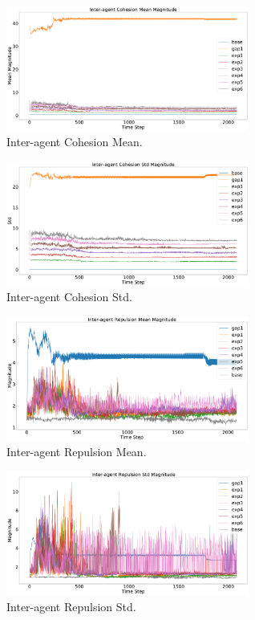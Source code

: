 \documentclass[12pt,a4paper]{IEEEtran}
\begin{document}
\begin{figure}[H]
	\begin{center}
		\includegraphics[width=8cm]{figures/InteragentCohesionMean}
	\end{center}
	\caption{Inter-agent Cohesion Mean. \label{fig:interagentCohesionMean}}
\end{figure}

\begin{figure}[H]
	\begin{center}
		\includegraphics[width=8cm]{figures/InteragentCohesionStd}
	\end{center}
	\caption{Inter-agent Cohesion Std. \label{fig:interagentCohesionStd}}
\end{figure}

\begin{figure}[H]
	\begin{center}
		\includegraphics[width=8cm]{figures/InteragentRepulsionMean}
	\end{center}
	\caption{Inter-agent Repulsion Mean. \label{fig:interagentRepulsionMean}}
\end{figure}

\begin{figure}[H]
	\begin{center}
		\includegraphics[width=8cm]{figures/InteragentRepulsionStd}
	\end{center}
	\caption{Inter-agent Repulsion Std. \label{fig:interagentRepulsionStd}}
\end{figure}
\end{document}
